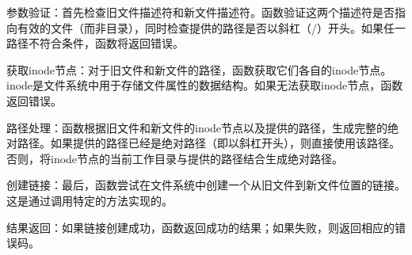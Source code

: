 参数验证：首先检查旧文件描述符和新文件描述符。函数验证这两个描述符是否指向有效的文件（而非目录），同时检查提供的路径是否以斜杠（/）开头。如果任一路径不符合条件，函数将返回错误。

获取inode节点：对于旧文件和新文件的路径，函数获取它们各自的inode节点。inode是文件系统中用于存储文件属性的数据结构。如果无法获取inode节点，函数返回错误。

路径处理：函数根据旧文件和新文件的inode节点以及提供的路径，生成完整的绝对路径。如果提供的路径已经是绝对路径（即以斜杠开头），则直接使用该路径。否则，将inode节点的当前工作目录与提供的路径结合生成绝对路径。

创建链接：最后，函数尝试在文件系统中创建一个从旧文件到新文件位置的链接。这是通过调用特定的方法实现的。

结果返回：如果链接创建成功，函数返回成功的结果；如果失败，则返回相应的错误码。

